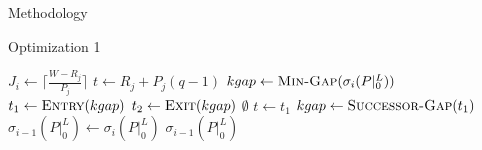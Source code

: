 \documentclass{article}
\begin{document}
\begin{section}{Methodology}
  \begin{subsection}{Optimization 1}

    \begin{algorithm}[H]
      \caption{Gap-Tranformation Algorithm Optimization 1: No Zero Gaps Reinserted}\label{gapxfrm2}
      \begin{algorithmic}[2]
          \State $J_{i} \gets \lceil\frac{W - R_{j}}{P_{j}}\rceil$
            \State $t \gets R_{j} + P_{j}(q-1)$
            \State $kgap \gets \Call{Min-Gap}{\sigma_{i}(P|_{0}^{L})}$
            \State $t_{1} \gets \Call{Entry}{kgap}$
            \State $t_{2} \gets \Call{Exit}{kgap}$
                \State \Return $\emptyset$
              \EndIf
                \State $t \gets t_{1}$
              \EndIf
                \State \Call{Gap-Delete}{$\sigma_{i}(P|_{0}^{L}), [t_{1},t_{2})$}
                    \State \Call{Gap-Insert}{$\sigma_{i}(P|_{0}^{L}), [t_{1},t)$}
                  \NewEndIf
                  \ExitWhile
                \EndIf
                      \State \Call{Gap-Insert}{$\sigma_{i}(P|_{0}^{L}), [t_{1},t)$}
                    \NewEndIf
                  \State \Call{Gap-Insert}{$\sigma_{i}(P|_{0}^{L}), [t + C_{j},t_{2})$}
                  \ExitWhile
                \EndIf
                    \State \Call{Gap-Insert}{$\sigma_{i}(P|_{0}^{L}), [t_{1},t)$}
                  \NewEndIf
                \EndIf
              \EndIf
                \State $kgap \gets \Call{Successor-Gap}{t_{1}}$
              \EndIf
            \EndWhile
          \EndFor
          \State $\sigma_{i-1}(P|_{0}^{L}) \gets \sigma_{i}(P|_{0}^{L})$
          \State \Return $\sigma_{i-1}(P|_{0}^{L})$
        \EndFunction
      \end{algorithmic}
      \end{algorithm}
  \end{subsection}


\end{section}
\end{document}
